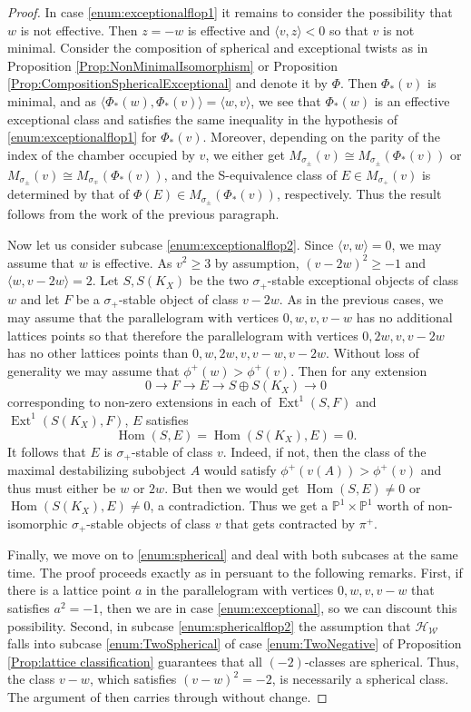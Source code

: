 \documentclass[leqno,11pt]{amsart}
\def\P{\ensuremath{\mathbb{P}}}
\def\Ext{\mathop{\mathrm{Ext}}\nolimits}
\def\Hom{\mathop{\mathrm{Hom}}\nolimits}
\theoremstyle{definition}
\def\P{\ensuremath{\mathbb{P}}}
\def\HH{\ensuremath{\mathcal H}}
\def\WW{\ensuremath{\mathcal W}}
\begin{document}
\begin{proof}
In case \ref{enum:exceptionalflop1} it remains to consider the possibility that $w$ is not effective.  Then $z=-w$ is effective and $\langle v,z\rangle<0$ so that $v$ is not minimal.  Consider the composition of spherical and exceptional twists as in Proposition \ref{Prop:NonMinimalIsomorphism} or Proposition \ref{Prop:CompositionSphericalExceptional} and denote it by $\Phi$.  Then $\Phi_*(v)$ is minimal, and as $\langle \Phi_*(w),\Phi_*(v)\rangle=\langle w,v\rangle$, we see that $\Phi_*(w)$ is an effective exceptional class and satisfies the same inequality in the hypothesis of \ref{enum:exceptionalflop1} for $\Phi_*(v)$.  Moreover, depending on the parity of the index of the chamber occupied by $v$, we either get $M_{\sigma_\pm}(v)\cong M_{\sigma_\pm}(\Phi_*(v))$ or $M_{\sigma_{\pm}}(v)\cong M_{\sigma_\mp}(\Phi_*(v))$, and the S-equivalence class of $E\in M_{\sigma_+}(v)$ is determined by that of $\Phi(E)\in M_{\sigma_\pm}(\Phi_*(v))$, respectively.  Thus the result follows from the work of the previous paragraph.

Now let us consider subcase \ref{enum:exceptionalflop2}.  Since $\langle v,w\rangle=0$, we may assume that $w$ is effective.  As $v^2\geq3$ by assumption, $(v-2w)^2\geq-1$ and $\langle w,v-2w\rangle=2$.  Let $S,S(K_X)$ be the two $\sigma_+$-stable exceptional objects of class $w$ and let $F$ be a $\sigma_+$-stable object of class $v-2w$.  As in the previous cases, we may assume that the parallelogram with vertices $0,w,v,v-w$ has no additional lattices points so that therefore the parallelogram with vertices $0,2w,v,v-2w$ has no other lattices points than $0,w,2w,v,v-w,v-2w$.  Without loss of generality we may assume that $\phi^+(w)>\phi^+(v)$.  Then for any extension $$0\to F\to E\to S\oplus S(K_X)\to 0$$ corresponding to non-zero extensions in each of $\Ext^1(S,F)$ and $\Ext^1(S(K_X),F)$, $E$ satisfies $$\Hom(S,E)=\Hom(S(K_X),E)=0.$$  It follows that $E$ is $\sigma_+$-stable of class $v$.  Indeed, if not, then the class of the maximal destabilizing subobject $A$ would satisfy $\phi^+(v(A))>\phi^+(v)$ and thus must either be $w$ or $2w$.  But then we would get $\Hom(S,E)\neq 0$ or $\Hom(S(K_X),E)\neq 0$, a contradiction.  Thus we get a $\P^1\times\P^1$ worth of non-isomorphic $\sigma_+$-stable objects of class $v$ that gets contracted by $\pi^+$.

Finally, we move on to \ref{enum:spherical} and deal with both subcases at the same time.  The proof proceeds exactly as in \cite[Lemma 9.1, case (b)]{BM14b} persuant to the following remarks.  First, if there is a lattice point $a$ in the parallelogram with vertices $0,w,v,v-w$ that satisfies $a^2=-1$, then we are in case \ref{enum:exceptional}, so we can discount this possibility.  Second, in subcase \ref{enum:sphericalflop2} the assumption that $\HH_\WW$ falls into subcase \ref{enum:TwoSpherical} of case \ref{enum:TwoNegative} of Proposition \ref{Prop:lattice classification} guarantees that all $(-2)$-classes are spherical.  Thus, the class $v-w$, which satisfies $(v-w)^2=-2$, is necessarily a spherical class.  The argument of \cite[Lemma 9.1, case (b)]{BM14b} then carries through without change.
\end{proof}
\end{document}
